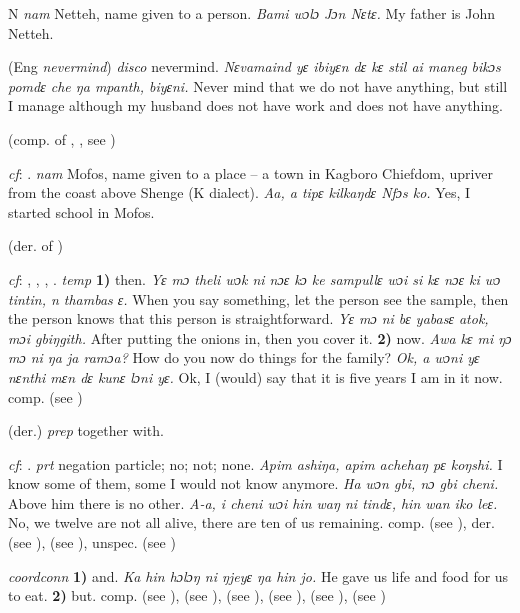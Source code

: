 \begin{letter}{N}
 \textit{nam} Netteh, name given to a person. \textit{Bami wɔlɔ Jɔn Nɛtɛ.} My father is John Netteh.

 (Eng \textit{nevermind}) \textit{disco} nevermind. \textit{Nɛvamaind yɛ ibiyɛn dɛ kɛ stil ai maneg bikɔs pomdɛ che ŋa mpanth, biyɛni.} Never mind that we do not have anything, but still I manage although my husband does not have work and does not have anything.

 (comp. of , , see ) 

 \textit{cf}: . \textit{nam} Mofos, name given to a place – a town in Kagboro Chiefdom, upriver from the coast above Shenge (K dialect). \textit{Aa, a tipɛ kilkaŋdɛ Nfɔs ko.} Yes, I started school in Mofos.

 (der. of )

 \textit{cf}: , , , . \textit{temp} \textbf{1)} then. \textit{Yɛ mɔ theli wɔk ni nɔɛ kɔ ke sampullɛ wɔi si kɛ nɔɛ ki wɔ tintin, n thambas ɛ.} When you say something, let the person see the sample, then the person knows that this person is straightforward. \textit{Yɛ mɔ ni bɛ yabasɛ atok, mɔi gbiŋgith.} After putting the onions in, then you cover it. \textbf{2)} now. \textit{Awa kɛ mi ŋɔ mɔ ni ŋa ja ramɔa?} How do you now do things for the family? \textit{Ok, a wɔni yɛ nɛnthi mɛn dɛ kunɛ lɔni yɛ.} Ok, I (would) say that it is five years I am in it now. comp.  (see ) 

 (der.) \textit{prep} together with.

 \textit{cf}: . \textit{prt} negation particle; no; not; none. \textit{Apim ashiŋa, apim achehaŋ pɛ koŋshi.} I know some of them, some I would not know anymore. \textit{Ha wɔn gbi, nɔ gbi cheni.} Above him there is no other. \textit{A-a, i cheni wɔi hin waŋ ni tindɛ, hin wan iko leɛ.} No, we twelve are not all alive, there are ten of us remaining. comp.  (see ), der.  (see ),  (see ), unspec.  (see ) 

 \textit{coordconn} \textbf{1)} and. \textit{Ka hin hɔlɔŋ ni ŋjeyɛ ŋa hin jo.} He gave us life and food for us to eat. \textbf{2)} but. comp.  (see ),  (see ),  (see ),  (see ),  (see ),  (see )


\end{letter}
